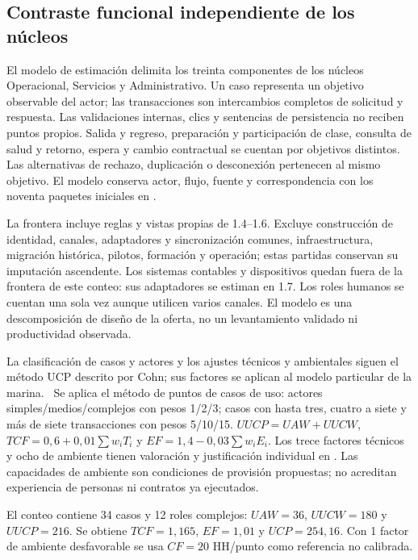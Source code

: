 \subsection{Contraste funcional independiente de los núcleos}
El modelo de estimación delimita los treinta componentes de los núcleos Operacional, Servicios y Administrativo. Un caso representa un objetivo observable del actor; las transacciones son intercambios completos de solicitud y respuesta. Las validaciones internas, clics y sentencias de persistencia no reciben puntos propios. Salida y regreso, preparación y participación de clase, consulta de salud y retorno, espera y cambio contractual se cuentan por objetivos distintos. Las alternativas de rechazo, duplicación o desconexión pertenecen al mismo objetivo. El modelo conserva actor, flujo, fuente y correspondencia con los noventa paquetes iniciales en .

La frontera incluye reglas y vistas propias de 1.4--1.6. Excluye construcción de identidad, canales, adaptadores y sincronización comunes, infraestructura, migración histórica, pilotos, formación y operación; estas partidas conservan su imputación ascendente. Los sistemas contables y dispositivos quedan fuera de la frontera de este conteo: sus adaptadores se estiman en 1.7. Los roles humanos se cuentan una sola vez aunque utilicen varios canales. El modelo es una descomposición de diseño de la oferta, no un levantamiento validado ni productividad observada.

La clasificación de casos y actores y los ajustes técnicos y ambientales siguen el método UCP descrito por Cohn; sus factores se aplican al modelo particular de la marina.~\parencite{cohn-ucp} Se aplica el método de puntos de casos de uso: actores simples/medios/complejos con pesos 1/2/3; casos con hasta tres, cuatro a siete y más de siete transacciones con pesos 5/10/15. $UUCP=UAW+UUCW$, $TCF=0,6+0,01\sum w_iT_i$ y $EF=1,4-0,03\sum w_iE_i$. Los trece factores técnicos y ocho de ambiente tienen valoración y justificación individual en . Las capacidades de ambiente son condiciones de provisión propuestas; no acreditan experiencia de personas ni contratos ya ejecutados.

El conteo contiene 34 casos y 12 roles complejos: $UAW=36$, $UUCW=180$ y $UUCP=216$. Se obtiene $TCF=1,165$, $EF=1,01$ y $UCP=254,16$. Con 1 factor de ambiente desfavorable se usa $CF=20$ HH/punto como referencia no calibrada.

